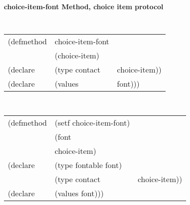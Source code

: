 %
%
%


{\samepage
{\large {\bf choice-item-font \hfill Method, choice item protocol}}
\begin{flushright} \parbox[t]{6.125in}{
\tt
\begin{tabular}{lll}
\raggedright
(defmethod & choice-item-font & \\
& (choice-item) \\
(declare &(type contact & choice-item))\\
(declare & (values &font)))
\end{tabular}
\rm

}\end{flushright}}

{\samepage
\begin{flushright} \parbox[t]{6.125in}{
\tt
\begin{tabular}{lll}
\raggedright
(defmethod & (setf choice-item-font) & \\
         & (font \\
         & choice-item) \\
(declare &(type fontable  font)\\
         &(type contact & choice-item))\\
(declare & (values font)))
\end{tabular}
\rm
}
\end{flushright}}


